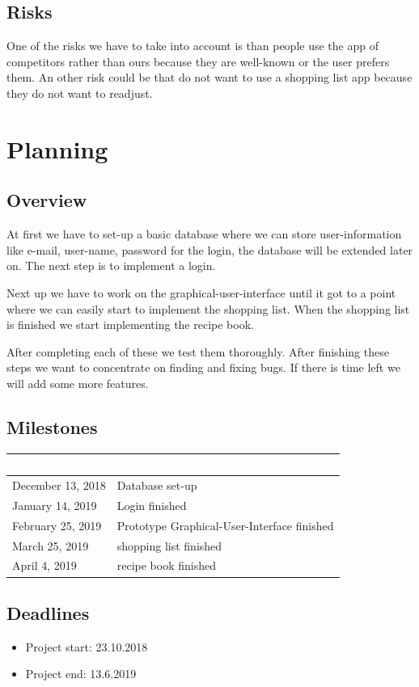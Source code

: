 \documentclass[12pt]{article}
\theoremstyle{definition}
\begin{document}
\subsection{Risks}
One of the risks we have to take into account is than people use the app of competitors rather than ours because they are well-known or the user prefers them. An other risk could be that do not want to use a shopping list app because they do not want to readjust.

\pagebreak

\section{Planning}
\subsection{Overview}
At first we have to set-up a basic database where we can store user-information like e-mail, user-name, password for the login, the database will be extended later on. The next step is to implement a login.

Next up we have to work on the graphical-user-interface until it got to a point where we can easily start to implement the shopping list. When the shopping list is finished we start implementing the recipe book.

After completing each of these we test them thoroughly. After finishing these steps we want to concentrate on finding and fixing bugs. If there is time left we will add some more features.

\subsection{Milestones}
\begin{tabular}{|l|l|}
\hline
\cellcolor[gray]{0.5}\textcolor{white}{Date} &
\cellcolor[gray]{0.5}\textcolor{white}{Milestone} \\ \hline
December 13, 2018 & Database set-up \\ \hline
January 14, 2019 & Login finished \\ \hline
February 25, 2019 & Prototype Graphical-User-Interface finished \\ \hline
March 25, 2019 & shopping list finished \\ \hline
April 4, 2019 & recipe book finished \\ \hline
\end{tabular}

\subsection{Deadlines}
\begin{itemize}
\item Project start: 23.10.2018
\item Project end: 13.6.2019
\end{itemize}
\end{document}
